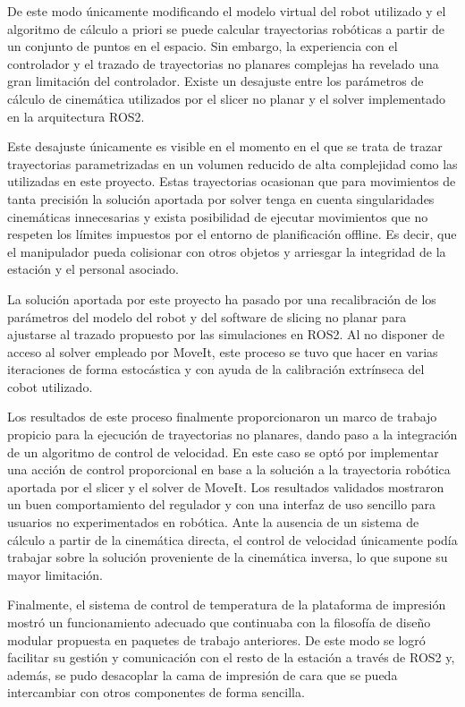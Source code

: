 De este modo únicamente modificando el modelo virtual del robot utilizado y el algoritmo de cálculo a priori se puede calcular trayectorias robóticas a partir de un conjunto de puntos en el espacio. Sin embargo, la experiencia con el controlador y el trazado de trayectorias no planares complejas ha revelado una gran limitación  del controlador. Existe un desajuste entre los parámetros de cálculo de cinemática utilizados por el slicer no planar y el solver implementado en la arquitectura ROS2. 

Este desajuste únicamente es visible en el momento en el que se trata de trazar trayectorias parametrizadas en un volumen reducido de alta complejidad como las utilizadas en este proyecto. Estas trayectorias ocasionan que para movimientos de tanta precisión la solución aportada por solver tenga en cuenta singularidades cinemáticas innecesarias y exista posibilidad de ejecutar movimientos que no respeten los límites impuestos por el entorno de planificación offline. Es decir, que el manipulador pueda colisionar con otros objetos y arriesgar la integridad de la estación y el personal asociado. 

La solución aportada por este proyecto ha pasado por una recalibración de los parámetros del modelo del robot y del software de slicing no planar para ajustarse al trazado propuesto por las simulaciones en ROS2. Al no disponer de acceso al solver empleado por MoveIt, este proceso se tuvo que hacer en varias iteraciones de forma estocástica y con ayuda de la calibración extrínseca del cobot utilizado.

Los resultados de este proceso finalmente proporcionaron un marco de trabajo propicio para la ejecución de trayectorias no planares, dando paso a la integración de un algoritmo de control de velocidad. En este caso se optó por implementar una acción de control proporcional en base a la solución a la trayectoria robótica aportada por el slicer y el solver de MoveIt. Los resultados validados mostraron un buen comportamiento del regulador y con una interfaz de uso sencillo para usuarios no experimentados en robótica. Ante la ausencia de un sistema de cálculo a partir de la cinemática directa, el control de velocidad únicamente podía trabajar sobre la solución proveniente de la cinemática inversa, lo que supone su mayor limitación. 

Finalmente, el sistema de control de temperatura de la plataforma de impresión mostró un funcionamiento adecuado que continuaba con la filosofía de diseño modular propuesta en paquetes de trabajo anteriores. De este modo se logró facilitar su gestión y comunicación con el resto de la estación a través de ROS2 y, además, se pudo desacoplar la cama de impresión de cara que se pueda intercambiar con otros componentes de forma sencilla. 

